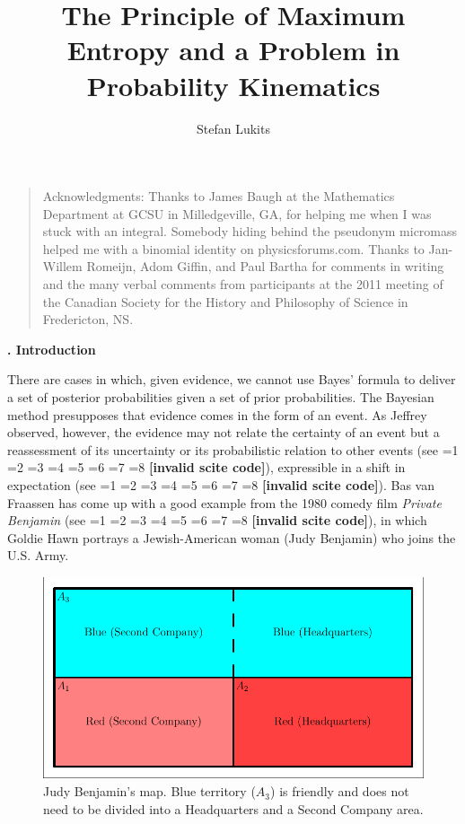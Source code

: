 \documentclass[12pt]{article}
\newcommand{\kapt}[1]{\textbf{{\thechap}. #1}\addtocounter{chap}{1}}
\newif\ifNumericalOrYear
\newcommand{\PageP}{p.~}
\newcommand{\PageP}{}
\newcommand{\scite}[3]{\ifnum#1=1\ifNumericalOrYear\citep{#2}\else\citeyearpar{#2}\fi\else
\ifnum#1=2\ifNumericalOrYear\citep[#3]{#2}\else\citep[{\PageP}#3]{#2}\fi\else
\ifnum#1=3\ifNumericalOrYear(\citet[#3]{#2})\else\citep[{\PageP}#3]{#2}\fi\else
\ifnum#1=4\ifNumericalOrYear\citet{#2}\else\citet{#2}\fi\else
\ifnum#1=5\ifNumericalOrYear(\citet{#2})\else\citep{#2}\fi\else
\ifnum#1=6\ifNumericalOrYear(\citet[#3]{#2})\else\citep[{\PageP}#3]{#2}\fi\else
\ifnum#1=7\ifNumericalOrYear\citep{#2}\else\citealp{#2}\fi\else
\ifnum#1=8\ifNumericalOrYear\citep[#3]{#2}\else\citealp[{\PageP}#3]{#2}\fi\else
\textbf{[invalid scite code]}\fi\fi\fi\fi\fi\fi\fi\fi}
\newenvironment{quotex}{\begin{quote}\begin{footnotesize}}{\end{footnotesize}\end{quote}}
\begin{document}
\title{The Principle of Maximum Entropy and a Problem in Probability Kinematics}

\author{Stefan Lukits}

\maketitle


\setcounter{chap}{1}

\begin{quotex}
  Acknowledgments: Thanks to James Baugh at the Mathematics Department
  at GCSU in Milledgeville, GA, for helping me when I was stuck with
  an integral. Somebody hiding behind the pseudonym micromass helped
  me with a binomial identity on physicsforums.com. Thanks to
  Jan-Willem Romeijn, Adom Giffin, and Paul Bartha for comments in
  writing and the many verbal comments from participants at the 2011
  meeting of the Canadian Society for the History and Philosophy of
  Science in Fredericton, NS.
\end{quotex}

\kapt{Introduction}

There are cases in which, given evidence, we cannot use Bayes' formula
to deliver a set of posterior probabilities given a set of prior
probabilities. The Bayesian method presupposes that evidence comes in
the form of an event. As Jeffrey observed, however, the evidence may
not relate the certainty of an event but a reassessment of its
uncertainty or its probabilistic relation to other events (see
\scite{8}{jeffrey65}{153ff}), expressible in a shift in expectation
(see \scite{7}{hobson71}{}). Bas van Fraassen has come up with a good
example from the 1980 comedy film \emph{Private Benjamin} (see
\scite{7}{fraassen81}{}), in which Goldie Hawn portrays a
Jewish-American woman (Judy Benjamin) who joins the U.S. Army.

\begin{figure}[h]
  \begin{flushright}
    \begin{minipage}[h]{.8\linewidth}
      \includegraphics[width=\textwidth]{judy.pdf}
      \caption{Judy Benjamin's map. Blue territory ($A_{3}$) is friendly and
        does not need to be divided into a Headquarters and a Second
        Company area.}
      \label{fig:map}
    \end{minipage}
  \end{flushright}
\end{figure}
\end{document}
